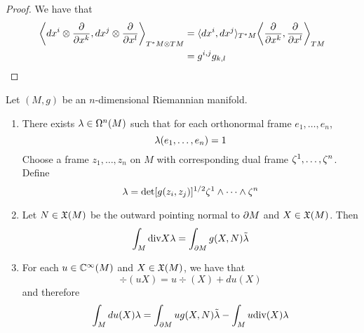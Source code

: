 \documentclass{book}
\begin{document}
	\begin{proof}
		We have that 
		\begin{align*}
			\bigg \langle dx^i \otimes \frac{\partial }{\partial x^k}, dx^j \otimes \frac{\partial}{\partial x^l} \bigg \rangle_{T^*M \otimes TM}
			& = \langle dx^i , dx^j \rangle_{T^*M} \bigg \langle \frac{\partial }{\partial x^k}, \frac{\partial }{\partial x^l} \bigg \rangle_{TM} \\
			& = g^{i,j}g_{k,l}
		\end{align*}
	\end{proof}


\begin{ex}
	Let $(M, g)$ be an $n$-dimensional Riemannian manifold.
	\begin{enumerate}
		\item There exists $\lambda \in \Omega^n(M)$ such that for each orthonormal frame $e_1, \ldots, e_n$, 
		$$\lambda(e_1, \ldots, e_n) = 1$$
		 Choose a frame $z_1, \ldots, z_n$ on $M$ with corresponding dual frame $\zeta^1, \ldots, \zeta^n$. Define $$\lambda = \det [g(z_i, z_j)]^{1/2} \zeta^1 \wedge \cdots \wedge \zeta^n$$
		\item Let $N \in \mathfrak{X}(M)$ be the outward pointing normal to $\partial M$ and $X \in \mathfrak{X}(M)$. Then 
		$$\int_M \text{div} X \lambda = \int_{\partial M} g(X, N) \tilde{\lambda}$$
		\item For each $u \in \mathbb{C}^{\infty}(M)$ and $X \in \mathfrak{X}(M)$, we have that 
		$$\div(uX) = u \div(X) + du(X)$$ 
		and therefore
		$$\int_M du(X) \lambda = \int_{\partial M} u g(X, N) \tilde{\lambda} - \int_{M} u \text{div}(X) \lambda$$
	\end{enumerate}
\end{ex}
\end{document}
